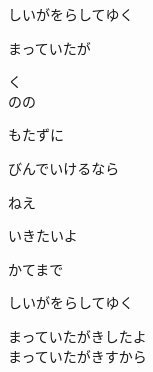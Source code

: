 {しいがをらしてゆく

まっていたが

く
\\

のの

もたずに


びんでいけるなら

ねえ

いきたいよ

かてまで

しいがをらしてゆく

まっていたがきしたよ
\\

まっていたがきすから

}